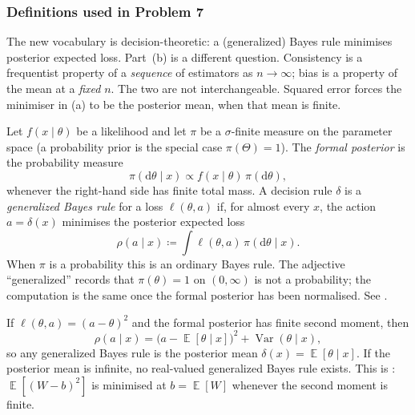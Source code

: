 \documentclass[11pt,a4paper]{article}
\DeclareMathOperator{\Var}{Var}
\DeclareMathOperator{\E}{\mathbb{E}}
\begin{document}
\setcounter{section}{7}

\subsubsection{Definitions used in Problem 7}

The new vocabulary is decision-theoretic: a (generalized) Bayes rule minimises posterior expected loss. Part~(b) is a different question. Consistency is a frequentist property of a \emph{sequence} of estimators as \( n\to\infty \); bias is a property of the mean at a \emph{fixed} \( n \). The two are not interchangeable. Squared error forces the minimiser in (a) to be the posterior mean, when that mean is finite.

\begin{definition}
\label{def:gen-bayes}
Let \( f(x\mid\theta) \) be a likelihood and let \( \pi \) be a \(\sigma\)-finite measure on the parameter space (a probability prior is the special case \( \pi(\Theta)=1 \)). The \emph{formal posterior} is the probability measure
\[
\pi(\mathrm{d}\theta\mid x)
\propto
f(x\mid\theta)\,\pi(\mathrm{d}\theta),
\]
whenever the right-hand side has finite total mass. A decision rule \( \delta \) is a \emph{generalized Bayes rule} for a loss \( \ell(\theta,a) \) if, for almost every \( x \), the action \( a=\delta(x) \) minimises the posterior expected loss
\[
\rho(a\mid x)
\coloneqq
\int \ell(\theta,a)\,\pi(\mathrm{d}\theta\mid x).
\]
When \( \pi \) is a probability this is an ordinary Bayes rule. The adjective ``generalized'' records that \( \pi(\theta)=1 \) on \( (0,\infty) \) is not a probability; the computation is the same once the formal posterior has been normalised. See \citep[\S11.1]{hogg2019}.
\end{definition}

\begin{proposition}
\label{prop:l2-posterior-mean}
If \( \ell(\theta,a)=(a-\theta)^{2} \) and the formal posterior has finite second moment, then
\[
\rho(a\mid x)
=
\bigl(a-\E[\theta\mid x]\bigr)^{2}
+
\Var(\theta\mid x),
\]
so any generalized Bayes rule is the posterior mean \( \delta(x)=\E[\theta\mid x] \). If the posterior mean is infinite, no real-valued generalized Bayes rule exists. This is \citep[\S11.1]{hogg2019}: \( \E[(W-b)^{2}] \) is minimised at \( b=\E[W] \) whenever the second moment is finite.
\end{proposition}
\end{document}

